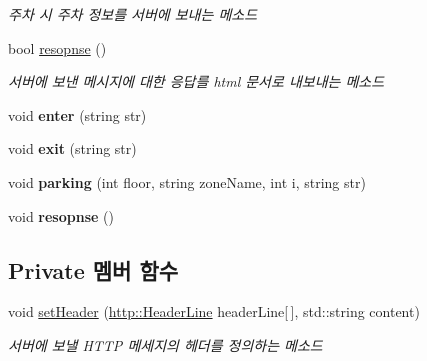 \begin{DoxyCompactItemize}
\begin{DoxyCompactList}\small\item\em 주차 시 주차 정보를 서버에 보내는 메소드 \end{DoxyCompactList}\item 
\mbox{\label{classps_1_1_a_p_i_a394416393e2ad3bee0141213bbb912a5}} 
bool \hyperlink{classps_1_1_a_p_i_a394416393e2ad3bee0141213bbb912a5}{resopnse} ()
\begin{DoxyCompactList}\small\item\em 서버에 보낸 메시지에 대한 응답를 html 문서로 내보내는 메소드 \end{DoxyCompactList}\item 
\mbox{\label{classps_1_1_a_p_i_a95079fba53baabfafc37e52a6019ba02}} 
void {\bfseries enter} (string str)
\item 
\mbox{\label{classps_1_1_a_p_i_a3d5c8c0fbc56d5dc664e5c0e6747f4f4}} 
void {\bfseries exit} (string str)
\item 
\mbox{\label{classps_1_1_a_p_i_a7d7ef9bf708cb009945fcf3b7064977f}} 
void {\bfseries parking} (int floor, string zone\+Name, int i, string str)
\item 
\mbox{\label{classps_1_1_a_p_i_a248e7f4b193ec8c5eb5adfa408e50779}} 
void {\bfseries resopnse} ()
\end{DoxyCompactItemize}
\subsection*{Private 멤버 함수}
\begin{DoxyCompactItemize}
\item 
void \hyperlink{classps_1_1_a_p_i_a5e11883deb21d5638fabbc7569f9f44f}{set\+Header} (\hyperlink{structhttp_1_1_header_line}{http\+::\+Header\+Line} header\+Line\mbox{[}$\,$\mbox{]}, std\+::string content)
\begin{DoxyCompactList}\small\item\em 서버에 보낼 H\+T\+TP 메세지의 헤더를 정의하는 메소드 \end{DoxyCompactList}\end{DoxyCompactItemize}
